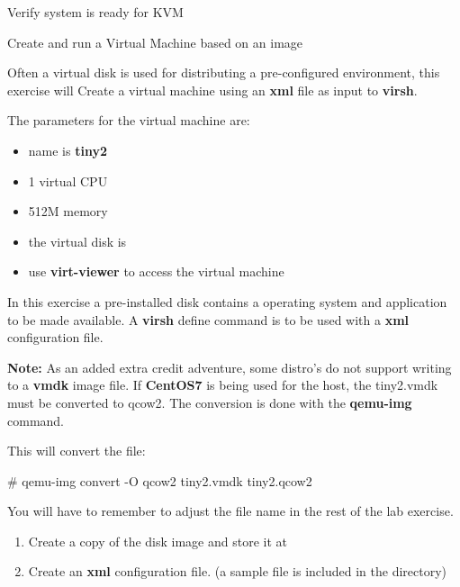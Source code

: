 \begin{Lab}
\begin{exe} {Verify system is ready for KVM }
\begin{sol}
\begin{enumerate}
      \end{enumerate}

   \end{sol}

\end{exe}

\begin{exe} {Create and run a Virtual Machine based on an image}

	Often a virtual disk is used for distributing a pre-configured environment,
	this exercise will Create a virtual machine using an \textbf{xml} file as input to \textbf{virsh}.

	The parameters for the virtual machine are:
	\begin{itemize}
		\item name is \textbf{tiny2}
		\item 1 virtual CPU
		\item 512M memory
		\item the virtual disk is 
		\item use \textbf{virt-viewer} to access the virtual machine
	\end{itemize}
	In this exercise a pre-installed disk  contains a 
	operating system and application to be made available. A \textbf{virsh}
	define command is 
	to be used with a \textbf{xml} configuration file. 

	\textbf{Note:} As an added extra credit adventure, some distro's 
	do not support writing to a \textbf{vmdk} image file. If \textbf{CentOS7}
	is being used for the host, the tiny2.vmdk must be converted to qcow2. The 
	conversion is done with the \textbf{qemu-img} command. 

	This will convert the file: 
		\begin{raw}
# qemu-img convert -O qcow2 tiny2.vmdk tiny2.qcow2 
		\end{raw}
	You will have to remember to adjust the file name in the rest of the lab exercise.

		
	\begin{sol}
	
		\begin{enumerate}
		\item Create a copy of the disk image and store it at 
		\item Create an \textbf{xml} configuration file. 
			(a sample file is included in the
				 directory)


\end{enumerate}
\end{sol}
\end{exe}
\end{Lab}
